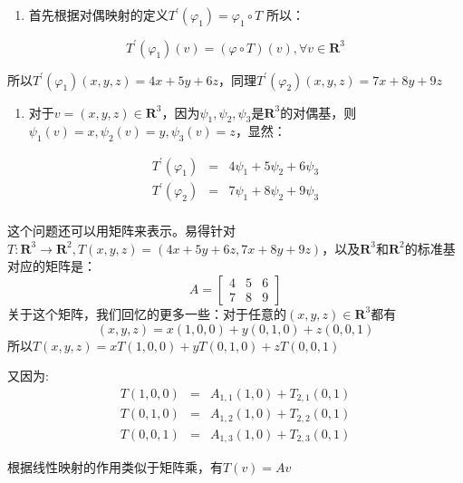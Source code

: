 \documentclass[10pt,a4paper,UTF8]{article}
\begin{document}
\begin{answer}
\begin{enumerate}
\item 首先根据对偶映射的定义\(T^{'}(\varphi_{1}) = \varphi_{1}\circ T\) 所以：
\end{enumerate}
\begin{equation}
\label{eq:5}
T^{'}(\varphi_{1})(v) = (\varphi \circ T)(v),\forall v\in \mathbf{R}^{3}
\end{equation}

所以\(T^{'}(\varphi_{1})(x,y,z) = 4x+5y+6z\)，同理\(T^{'}(\varphi_{2})(x,y,z) = 7x+8y+9z\)

\begin{enumerate}
\item 对于\(v=(x,y,z)\in \mathbf{R}^{3}\)，因为\(\psi_{1},\psi_{2},\psi_{3}\)是\(\mathbf{R}^{3}\)的对偶基，则\(\psi_{1}(v) = x, \psi_{2}(v) = y,\psi_{3} (v) = z\)，显然：
\end{enumerate}
\begin{eqnarray}
\label{eq:6}
T^{'}(\varphi_{1}) &=& 4\psi_{1} + 5\psi_{2} + 6\psi_{3} \\
T^{'}(\varphi_{2}) &=& 7\psi_{1} + 8\psi_{2} + 9\psi_{3} \\
\end{eqnarray}

这个问题还可以用矩阵来表示。易得针对\(T: \mathbf{R}^{3} \rightarrow \mathbf{R}^{2}, T(x,y,z) = (4x+5y+6z, 7x+8y+9z)\)，以及\(\mathbf{R}^{3}\)和\(\mathbf{R}^{2}\)的标准基对应的矩阵是：
\begin{equation}
\label{eq:7}
A=
\begin{bmatrix}
4 & 5 & 6 \\
7 & 8 & 9
\end{bmatrix}
\end{equation}
关于这个矩阵，我们回忆的更多一些：对于任意的\((x,y,z)\in \mathbf{R}^{3}\)都有
\begin{equation}
\label{eq:8}
(x,y,z) = x(1,0,0) + y(0,1,0) + z(0,0,1)
\end{equation}
所以\(T(x,y,z) = xT(1,0,0) + yT(0,1,0) + zT(0,0,1)\)

又因为:
\begin{eqnarray}
\label{eq:9}
T(1,0,0)&=&A_{1,1}(1,0) + T_{2,1}(0,1) \\
T(0,1,0)&=&A_{1,2}(1,0) + T_{2,2}(0,1) \\
T(0,0,1)&=&A_{1,3}(1,0) + T_{2,3}(0,1)
\end{eqnarray}

根据线性映射的作用类似于矩阵乘，有\(T(v) = Av\)


\end{answer}
\end{document}
